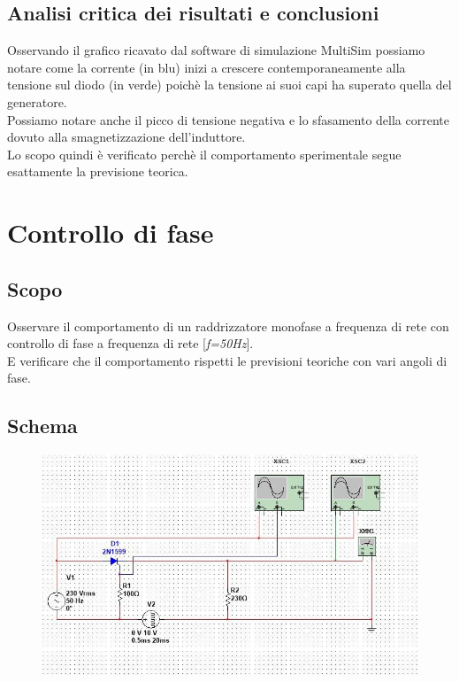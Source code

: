 \documentclass[12pt]{article}
\begin{document}
\subsection{Analisi critica dei risultati e conclusioni}
Osservando il grafico ricavato dal software di simulazione MultiSim possiamo notare come la corrente (in blu)
inizi a crescere contemporaneamente alla tensione sul diodo (in verde) poichè la tensione ai suoi capi
ha superato quella del generatore.\\
Possiamo notare anche il picco di tensione negativa e lo sfasamento della corrente dovuto alla smagnetizzazione
dell'induttore.\\
Lo scopo quindi è verificato perchè il comportamento sperimentale segue esattamente la previsione teorica.\\
\newpage
\section{Controllo di fase}
\subsection{Scopo}
Osservare il comportamento di un raddrizzatore monofase a frequenza di rete con controllo di fase a frequenza
di rete [\textit{f=50Hz}].\\
E verificare che il comportamento rispetti le previsioni teoriche con vari angoli di fase.\\
\subsection{Schema}
\begin{figure}[H]
	\includegraphics[scale=0.4]{schema.jpg}
\end{figure}
\end{document}
